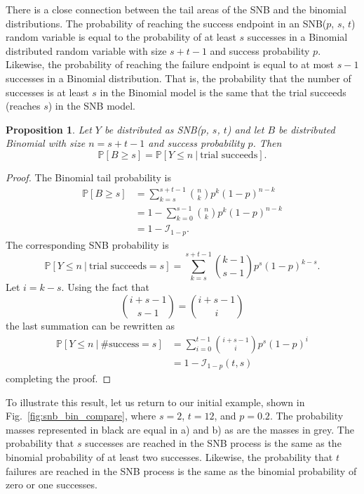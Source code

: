 \documentclass[review]{elsarticle}
\newtheorem{prop}{Proposition}
\begin{document}
There is a close connection between the tail areas of the SNB and the 
binomial distributions.
The probability of reaching the success endpoint in an 
SNB($p$, $s$, $t$) random variable is 
equal to the probability of at least $s$ successes in a Binomial distributed 
random variable with size $s+t-1$ and success probability $p$. 
Likewise, the probability of reaching the failure endpoint is equal
to at most $s-1$ successes in a Binomial distribution. That is, the
probability that the number of successes is at least $s$ in the Binomial
model is the same that the trial succeeds (reaches $s$) in the SNB model.
\begin{prop} \label{binomial_tail}
Let $Y$ be distributed as SNB($p$, $s$, $t$) and let 
$B$ be distributed Binomial with size $n=s+t-1$ and success probability
$p$. Then
\begin{equation}
\mathbb{P}[B \geq s] = \mathbb{P} [Y \leq n\ |\ \text{trial succeeds}].
\end{equation}
\end{prop}
\begin{proof}
The Binomial tail probability is
\begin{align*}
\mathbb{P}[B \geq s] &= \sum_{k=s}^{s+t-1} {n \choose k} p^k (1-p)^{n-k} \\
  &= 1 - \sum_{k=0}^{s-1} {n \choose k} p^k (1-p)^{n-k} \\
  &= 1 - \mathcal{I}_{1-p}.
\end{align*}
The corresponding SNB probability is
\begin{equation*}
\mathbb{P} [Y \leq n\ |\ \text{trial succeeds}=s] 
  = \sum_{k=s}^{s+t-1} {k-1 \choose s-1} p^s (1-p)^{k-s}.
\end{equation*}
Let $i=k-s$. Using the fact that
\begin{equation*}
{i+s-1 \choose s-1} = {i+s-1 \choose i}
\end{equation*}
the last summation can be rewritten as
\begin{align}
\mathbb{P} [Y \leq n\ |\ \text{\#success} = s] &= \sum_{i=0}^{t-1} 
  {i+s-1 \choose i} p^s (1-p)^i\\
  &= 1 - \mathcal{I}_{1-p}(t, s)
\end{align}
completing the proof.
\end{proof}

To illustrate this result, let us return to our initial example, shown
in Fig.~\ref{fig:snb_bin_compare}, 
where $s=2$, $t=12$, and $p=0.2$.  The probability masses represented in 
black are equal in a) and b) as are the masses in grey.
The probability that $s$
successes are reached in the SNB process is the same as the binomial 
probability of at least two successes. Likewise, the probability that $t$ 
failures are reached in the SNB process is the same as the binomial
probability of zero or one successes.
\end{document}

